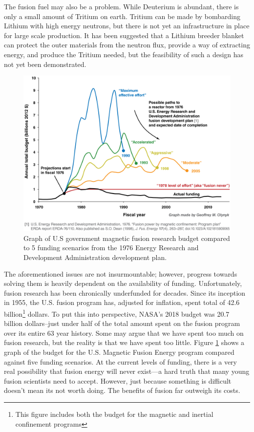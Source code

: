 The fusion fuel may also be a problem. While Deuterium is abundant, there is only a small amount of Tritium on earth. Tritium can be made by bombarding Lithium with high energy neutrons, but there is not yet an infrastructure in place for large scale production. It has been suggested that a Lithium breeder blanket can protect the outer materials from the neutron flux, provide a way of extracting energy, and produce the Tritium needed, but the feasibility of such a design has not yet been demonstrated.

\begin{figure}
    \centering
    \includegraphics[width=12cm]{figures/fusion_never.png}
    \caption{Graph of U.S government magnetic fusion research budget compared to 5 funding scenarios from the 1976 Energy Research and Development Administration development plan.\cite{1976_fusion}}
    \label{fig:fusion_never}
\end{figure}
The aforementioned issues are not insurmountable; however, progress towards solving them is heavily dependent on the availability of funding. Unfortunately, fusion research has been chronically underfunded for decades. Since its inception in 1955, the U.S. fusion program has, adjusted for inflation, spent total of 42.6 billion\footnote{This figure includes both the budget for the magnetic and inertial confinement programs} dollars. To put this into perspective, NASA's 2018 budget was 20.7 billion dollars--just under half of the total amount spent on the fusion program over its entire 63 year history. Some may argue that we have spent too much on fusion research, but the reality is that we have spent too little. Figure \ref{fig:fusion_never} shows a graph of the budget for the U.S. Magnetic Fusion Energy program compared against five funding scenarios\cite{1976_fusion}. At the current levels of funding, there is a very real possibility that fusion energy will never exist---a hard truth that many young fusion scientists need to accept.
However, just because something is difficult doesn't mean its not worth doing. The benefits of fusion far outweigh its costs.

